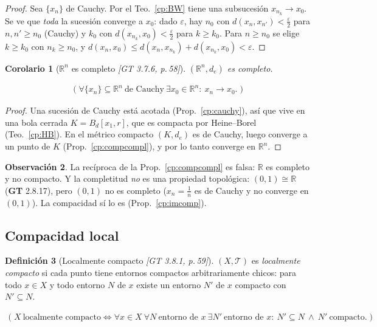 \documentclass[11pt,a4paper]{article}
\newcommand{\lgc}[1]{\par\vspace{-3pt}\begin{gather*}\big(\;#1\;\big)\end{gather*}\vspace{-6pt}}
\theoremstyle{definition}
\newtheorem{definicion}{Definición}[section]
\newtheorem{observacion}[definicion]{Observación}
\theoremstyle{plain}
\newtheorem{corolario}[definicion]{Corolario}
\newcommand{\fnt}[1]{{\normalfont\small\itshape\color{gray!150!black}[#1]}}
\newcommand{\R}{\mathbb{R}}
\newcommand{\Bolac}[2]{B_d[#1,#2]}
\newcommand{\tp}{\mathcal{T}}
\begin{document}
\begin{proof}
Sea $\{x_n\}$ de Cauchy. Por el Teo.~\ref{cp:BW} tiene una subsucesión $x_{n_k}\to x_0$. Se ve que \emph{toda} la sucesión converge a $x_0$: dado $\varepsilon$, hay $n_0$ con $d(x_n,x_{n'})<\tfrac\varepsilon2$ para $n,n'\ge n_0$ (Cauchy) y $k_0$ con $d(x_{n_k},x_0)<\tfrac\varepsilon2$ para $k\ge k_0$. Para $n\ge n_0$ se elige $k\ge k_0$ con $n_k\ge n_0$, y $d(x_n,x_0)\le d(x_n,x_{n_k})+d(x_{n_k},x_0)<\varepsilon$.
\end{proof}

\begin{corolario}[$\R^n$ es completo \fnt{GT 3.7.6, p.\,58}]\label{cp:Rncompl}
$(\R^n,d_e)$ es completo.
\lgc{\forall\{x_n\}\subseteq\R^n\ \text{de Cauchy}\ \exists x_0\in\R^n:\ x_n\to x_0.}
\end{corolario}

\begin{proof}
Una sucesión de Cauchy está acotada (Prop.~\ref{cp:cauchy}), así que vive en una bola cerrada $K=\Bolac{x_1}{r}$, que es compacta por Heine--Borel (Teo.~\ref{cp:HB}). En el métrico compacto $(K,d_e)$ es de Cauchy, luego converge a un punto de $K$ (Prop.~\ref{cp:compcompl}), y por lo tanto converge en $\R^n$.
\end{proof}

\begin{observacion}
La recíproca de la Prop.~\ref{cp:compcompl} es falsa: $\R$ es completo y no compacto. Y la completitud \emph{no} es una propiedad topológica: $(0,1)\cong\R$ (\textbf{GT} 2.8.17), pero $(0,1)$ no es completo ($x_n=\tfrac1n$ es de Cauchy y no converge en $(0,1)$). La compacidad sí lo es (Prop.~\ref{cp:imcomp}).
\end{observacion}

\subsection[Compacidad local]{Compacidad local}\label{cp:sub-loc}

\begin{definicion}[Localmente compacto \fnt{GT 3.8.1, p.\,59}]
$(X,\tp)$ es \emph{localmente compacto} si cada punto tiene entornos compactos arbitrariamente chicos: para todo $x\in X$ y todo entorno $N$ de $x$ existe un entorno $N'$ de $x$ compacto con $N'\subseteq N$.
\lgc{X\ \text{localmente compacto}\iff \forall x\in X\ \forall N\ \text{entorno de } x\ \exists N'\ \text{entorno de } x:\ N'\subseteq N\ \wedge\ N'\ \text{compacto}.}
\end{definicion}
\end{document}
